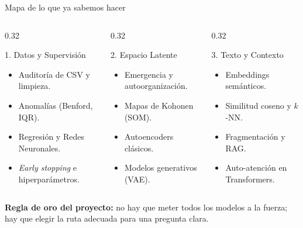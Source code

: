 \documentclass[aspectratio=169,11pt]{beamer}
\begin{document}
\begin{frame}{Mapa de lo que ya sabemos hacer}
  \begin{columns}[T]
    \begin{column}{0.32\textwidth}
      \begin{block}{1. Datos y Supervisión}
        \small
        \begin{itemize}
          \item Auditoría de CSV y limpieza.
          \item Anomalías (Benford, IQR).
          \item Regresión y Redes Neuronales.
          \item \emph{Early stopping} e hiperparámetros.
        \end{itemize}
      \end{block}
    \end{column}
    \begin{column}{0.32\textwidth}
      \begin{block}{2. Espacio Latente}
        \small
        \begin{itemize}
          \item Emergencia y autoorganización.
          \item Mapas de Kohonen (SOM).
          \item Autoencoders clásicos.
          \item Modelos generativos (VAE).
        \end{itemize}
      \end{block}
    \end{column}
    \begin{column}{0.32\textwidth}
      \begin{block}{3. Texto y Contexto}
        \small
        \begin{itemize}
          \item Embeddings semánticos.
          \item Similitud coseno y $k$-NN.
          \item Fragmentación y RAG.
          \item Auto-atención en Transformers.
        \end{itemize}
      \end{block}
    \end{column}
  \end{columns}
  \vfill
  \centering
  \textbf{Regla de oro del proyecto:} no hay que meter todos los modelos a la fuerza; hay que elegir la ruta adecuada para una pregunta clara.
\end{frame}
\end{document}
